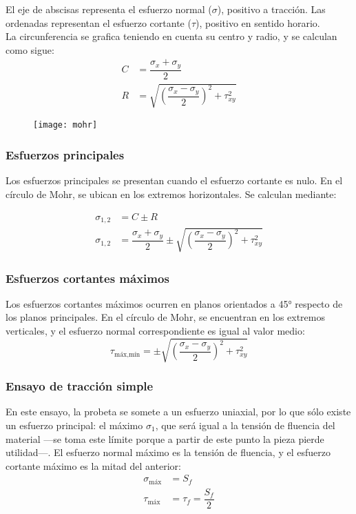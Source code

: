 \documentclass[spanish,11pt,a4paper]{article}
\begin{document}
	El eje de abscisas representa el esfuerzo normal ($\sigma$), positivo a tracción. Las ordenadas representan el esfuerzo cortante ($\tau$), positivo en sentido horario.\\
	
	La circunferencia se grafica teniendo en cuenta su centro y radio, y se calculan como sigue:
	\begin{align*}
		C &= \dfrac{\sigma_x + \sigma_y}{2}\\
		R &= \sqrt{\left(\dfrac{\sigma_x - \sigma_y}{2}\right)^2 + \tau_{xy}^2}
	\end{align*}
	\begin{figure}[h]
		\centering\texttt{[image: mohr]}
	\end{figure}
	
	\subsubsection{Esfuerzos principales}
	
	Los esfuerzos principales se presentan cuando el esfuerzo cortante es nulo. En el círculo de Mohr, se ubican en los extremos horizontales. Se calculan mediante:
	
	\begin{align*}
		\sigma_{1,2} &= C \pm R \\
		\sigma_{1,2} &= \dfrac{\sigma_x + \sigma_y}{2} \pm \sqrt{\left(\dfrac{\sigma_x - \sigma_y}{2}\right)^2 + \tau_{xy}^2}
	\end{align*}
	
	\subsubsection{Esfuerzos cortantes máximos}
	
	Los esfuerzos cortantes máximos ocurren en planos orientados a 45° respecto de los planos principales. En el círculo de Mohr, se encuentran en los extremos verticales, y el esfuerzo normal correspondiente es igual al valor medio:
	\[\tau_{\text{máx},\text{mín}} = \pm  \sqrt{\left(\dfrac{\sigma_x - \sigma_y}{2}\right)^2 + \tau_{xy}^2}\]
	
	\subsubsection{Ensayo de tracción simple}
	
	En este ensayo, la probeta se somete a un esfuerzo uniaxial, por lo que sólo existe un esfuerzo principal: el máximo $\sigma_1$, que será igual a la tensión de fluencia del material —se toma este límite porque a partir de este punto la pieza pierde utilidad—. El esfuerzo normal máximo es la tensión de fluencia, y el esfuerzo cortante máximo es la mitad del anterior:
	\begin{align*}
		\sigma_\text{máx} &= S_f \\
		\tau_\text{máx} &= \tau_f = \dfrac{S_f}{2}
	\end{align*}
	  
\end{document}
